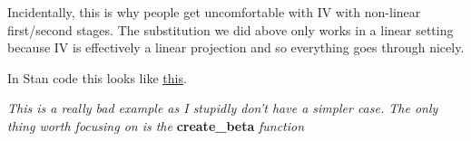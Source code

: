 \documentclass{article}
\begin{document}
Incidentally, this is why people get uncomfortable with IV with non-linear first/second 
stages. The substitution we did above only works in a linear setting because IV 
is effectively a linear projection and so everything goes through nicely.


In Stan code this looks like \href{https://gist.github.com/EdJeeOnGitHub/f728ac156da2d8dafa4dda8cd1a6b336}{this}.

\textit{This is a really bad example as I stupidly don't have a simpler case. The only 
thing worth focusing on is the } \textbf{create\_beta} \textit{function}
\end{document}
